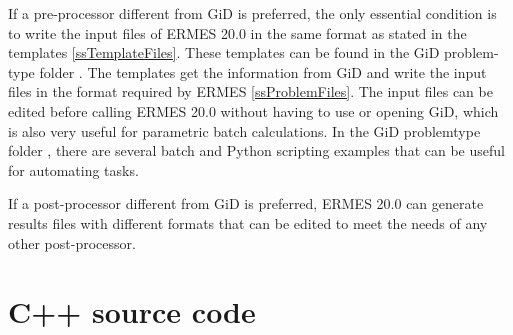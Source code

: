 If a pre-processor different from GiD is preferred, the only essential condition is to write the input files of ERMES 20.0 in the same format as stated in the  templates \ref{ssTemplateFiles}. These templates can be found in the GiD problem-type folder . The  templates get the information from GiD and write the input files  in the format required by ERMES \ref{ssProblemFiles}. The input files  can be edited before calling ERMES 20.0 without having to use or opening GiD, which is also very useful for parametric batch calculations. In the GiD problemtype folder , there are several batch and Python scripting examples that can be useful for automating tasks.

If a post-processor different from GiD is preferred, ERMES 20.0 can generate results files with different formats that can be edited to meet the needs of any other post-processor.

\section{C++ source code}

